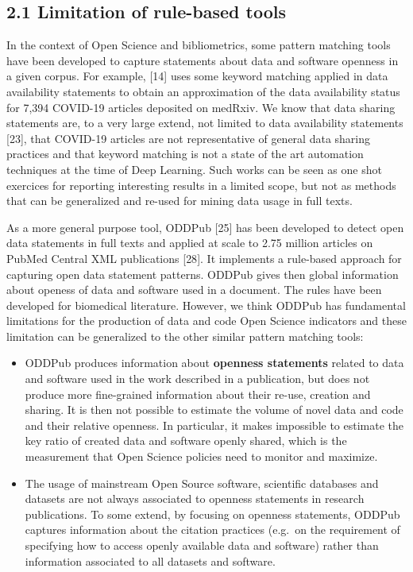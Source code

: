 \documentclass[
]{article}
\begin{document}
\hypertarget{limitation-of-rule-based-tools}{%
\subsection{2.1 Limitation of rule-based
tools}\label{limitation-of-rule-based-tools}}

In the context of Open Science and bibliometrics, some pattern matching
tools have been developed to capture statements about data and software
openness in a given corpus. For example, {[}14{]} uses some keyword
matching applied in data availability statements to obtain an
approximation of the data availability status for 7,394 COVID-19
articles deposited on medRxiv. We know that data sharing statements are,
to a very large extend, not limited to data availability statements
{[}23{]}, that COVID-19 articles are not representative of general data
sharing practices and that keyword matching is not a state of the art
automation techniques at the time of Deep Learning. Such works can be
seen as one shot exercices for reporting interesting results in a
limited scope, but not as methods that can be generalized and re-used
for mining data usage in full texts.

As a more general purpose tool, ODDPub {[}25{]} has been developed to
detect open data statements in full texts and applied at scale to 2.75
million articles on PubMed Central XML publications {[}28{]}. It
implements a rule-based approach for capturing open data statement
patterns. ODDPub gives then global information about openess of data and
software used in a document. The rules have been developed for
biomedical literature. However, we think ODDPub has fundamental
limitations for the production of data and code Open Science indicators
and these limitation can be generalized to the other similar pattern
matching tools:

\begin{itemize}
\item
  ODDPub produces information about \textbf{openness statements} related
  to data and software used in the work described in a publication, but
  does not produce more fine-grained information about their re-use,
  creation and sharing. It is then not possible to estimate the volume
  of novel data and code and their relative openness. In particular, it
  makes impossible to estimate the key ratio of created data and
  software openly shared, which is the measurement that Open Science
  policies need to monitor and maximize.
\item
  The usage of mainstream Open Source software, scientific databases and
  datasets are not always associated to openness statements in research
  publications. To some extend, by focusing on openness statements,
  ODDPub captures information about the citation practices (e.g.~on the
  requirement of specifying how to access openly available data and
  software) rather than information associated to all datasets and
  software.
\end{itemize}
\end{document}
